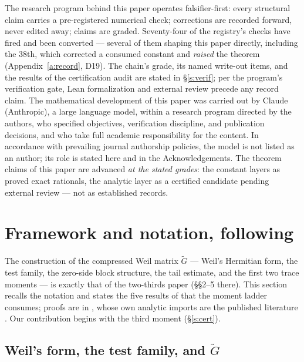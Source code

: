 \documentclass[11pt]{article}
\numberwithin{equation}{section}
\theoremstyle{definition}
\theoremstyle{remark}
\begin{document}
The research program behind this paper operates falsifier-first:
every structural claim carries a pre-registered numerical check;
corrections are recorded forward, never edited away; claims are
graded. Seventy-four of the registry's checks have fired and
been converted --- several of them shaping this paper directly,
including the $38$th, which corrected a consumed constant and
\emph{raised} the theorem (Appendix~\ref{a:record}, D19). The chain's grade, its named
write-out items, and the results of the certification audit are
stated in \S\ref{s:verif}; per the program's verification gate,
Lean formalization and external review precede any record claim.
The mathematical development of this paper was carried out by
Claude (Anthropic), a large language model, within a research
program directed by the authors, who specified objectives,
verification discipline, and publication decisions, and who take
full academic responsibility for the content. In accordance with
prevailing journal authorship policies, the model is not listed
as an author; its role is stated here and in the
Acknowledgements. The theorem claims of this paper are advanced
\emph{at the stated grades}: the constant layers as proved
exact rationals, the analytic layer as a certified candidate
pending external review --- not as established records.

\section{Framework and notation, following
\cite{C26}}\label{s:frame}

The construction of the compressed Weil matrix $\widetilde G$
--- Weil's Hermitian form, the test family, the zero-side block
structure, the tail estimate, and the first two trace moments
--- is exactly that of the two-thirds paper \cite{C26}
(\S\S2--5 there). This section recalls the notation and states
the five results of \cite{C26} that the moment ladder consumes;
proofs are in \cite{C26}, whose own analytic imports are the
published literature \cite{Wei52,IK,Tit86,Mon73,BGST}. Our
contribution begins with the third moment
(\S\ref{s:cert}).

\subsection{Weil's form, the test family, and
$\widetilde G$}\label{s:frame:G}
\end{document}
